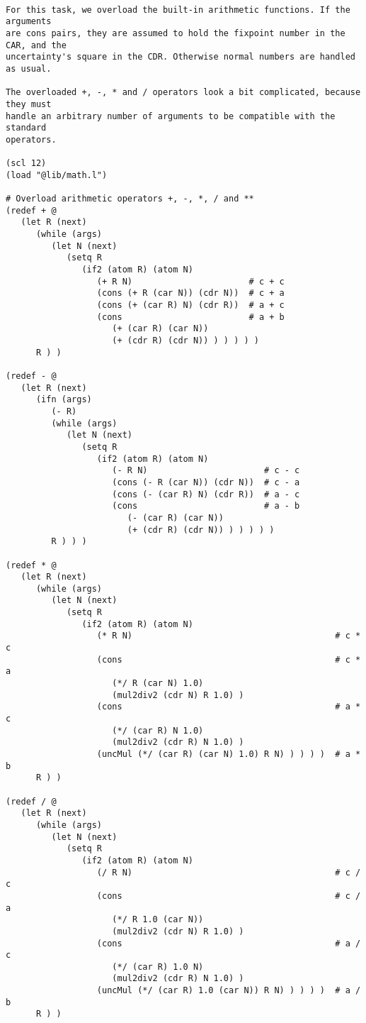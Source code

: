\begin{verbatim}

For this task, we overload the built-in arithmetic functions. If the arguments
are cons pairs, they are assumed to hold the fixpoint number in the CAR, and the
uncertainty's square in the CDR. Otherwise normal numbers are handled as usual.

The overloaded +, -, * and / operators look a bit complicated, because they must
handle an arbitrary number of arguments to be compatible with the standard
operators.

(scl 12)
(load "@lib/math.l")

# Overload arithmetic operators +, -, *, / and **
(redef + @
   (let R (next)
      (while (args)
         (let N (next)
            (setq R
               (if2 (atom R) (atom N)
                  (+ R N)                       # c + c
                  (cons (+ R (car N)) (cdr N))  # c + a
                  (cons (+ (car R) N) (cdr R))  # a + c
                  (cons                         # a + b
                     (+ (car R) (car N))
                     (+ (cdr R) (cdr N)) ) ) ) ) )
      R ) )

(redef - @
   (let R (next)
      (ifn (args)
         (- R)
         (while (args)
            (let N (next)
               (setq R
                  (if2 (atom R) (atom N)
                     (- R N)                       # c - c
                     (cons (- R (car N)) (cdr N))  # c - a
                     (cons (- (car R) N) (cdr R))  # a - c
                     (cons                         # a - b
                        (- (car R) (car N))
                        (+ (cdr R) (cdr N)) ) ) ) ) )
         R ) ) )

(redef * @
   (let R (next)
      (while (args)
         (let N (next)
            (setq R
               (if2 (atom R) (atom N)
                  (* R N)                                        # c * c
                  (cons                                          # c * a
                     (*/ R (car N) 1.0)
                     (mul2div2 (cdr N) R 1.0) )
                  (cons                                          # a * c
                     (*/ (car R) N 1.0)
                     (mul2div2 (cdr R) N 1.0) )
                  (uncMul (*/ (car R) (car N) 1.0) R N) ) ) ) )  # a * b
      R ) )

(redef / @
   (let R (next)
      (while (args)
         (let N (next)
            (setq R
               (if2 (atom R) (atom N)
                  (/ R N)                                        # c / c
                  (cons                                          # c / a
                     (*/ R 1.0 (car N))
                     (mul2div2 (cdr N) R 1.0) )
                  (cons                                          # a / c
                     (*/ (car R) 1.0 N)
                     (mul2div2 (cdr R) N 1.0) )
                  (uncMul (*/ (car R) 1.0 (car N)) R N) ) ) ) )  # a / b
      R ) )


\end{verbatim}

